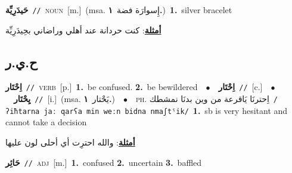 \documentclass[10pt,a4paper,twoside]{article} %
\begin{document}
\begin{multicols}{2}
{\setlength\topsep{0pt}\textbf{\foreignlanguage{arabic}{حَيدَرِيِّة}}\ {\color{gray}\texttt{//}\color{black}}\ \textsc{noun}\ [m.]\ \color{gray}(msa. \foreignlanguage{arabic}{إِسوارَة فضة}~\foreignlanguage{arabic}{\textbf{١.}})\color{black}\ \textbf{1.}~silver bracelet\  \begin{flushright}\color{gray}\foreignlanguage{arabic}{\textbf{\underline{\foreignlanguage{arabic}{أمثلة}}}: كنت حردانة عند أهلي وراضاني بحِيدَرِيِّة}\end{flushright}\color{black}} \vspace{2mm}

\vspace{-3mm}
\subsection*{\color{blue}\foreignlanguage{arabic}{ح.ي.ر}\color{blue}{}} 

{\setlength\topsep{0pt}\textbf{\foreignlanguage{arabic}{اِحْتَار}}\ {\color{gray}\texttt{//}\color{black}}\ \textsc{verb}\ [p.]\ \textbf{1.}~be confused.  \textbf{2.}~be bewildered\ \ $\bullet$\ \ \setlength\topsep{0pt}\textbf{\foreignlanguage{arabic}{اِحْتَار}}\ {\color{gray}\texttt{//}\color{black}}\ [c.]\ \ $\bullet$\ \ \setlength\topsep{0pt}\textbf{\foreignlanguage{arabic}{يِحْتَار}}\ {\color{gray}\texttt{//}\color{black}}\ [i.]\ \color{gray}(msa. \foreignlanguage{arabic}{يَحْتار}~\foreignlanguage{arabic}{\textbf{١.}})\color{black}\ \ $\bullet$\ \ \textsc{ph.} \color{gray} \foreignlanguage{arabic}{اِحترنَا يَاقرعة من وين بدنَا نمشطك}\color{black}\ {\color{gray}\texttt{/{\sffamily ʔiħtarna jaː qarʕa min weːn bidna nmaʃtˤik}/}\color{black}}\ \textbf{1.}~sb is very hesitant and cannot take a decision\  \begin{flushright}\color{gray}\foreignlanguage{arabic}{\textbf{\underline{\foreignlanguage{arabic}{أمثلة}}}: والله احترِت أي أحلى لون عليها}\end{flushright}\color{black}} \vspace{2mm}

{\setlength\topsep{0pt}\textbf{\foreignlanguage{arabic}{حَائِر}}\ {\color{gray}\texttt{//}\color{black}}\ \textsc{adj}\ [m.]\ \textbf{1.}~confused  \textbf{2.}~uncertain  \textbf{3.}~baffled\ } \vspace{2mm}


\end{multicols}
\end{document}
